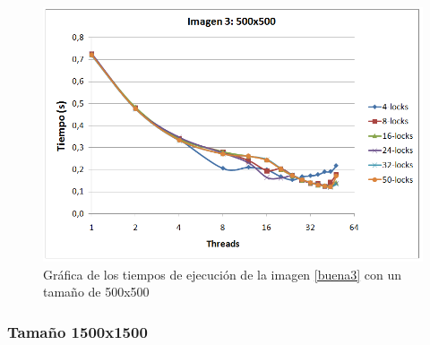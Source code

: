 \begin{figure}[H]
	\captionsetup{justification=centering}
	\centering
	\includegraphics[width=.7\textwidth]{./imagenes/graf3-500}
	\caption{Gr\'{a}fica de los tiempos de ejecuci\'{o}n de la imagen \ref{buena3} con un tama\~{n}o de 500x500}	
	\label{graf3-500}
\end{figure}


\subsubsection{Tama\~{n}o 1500x1500}

